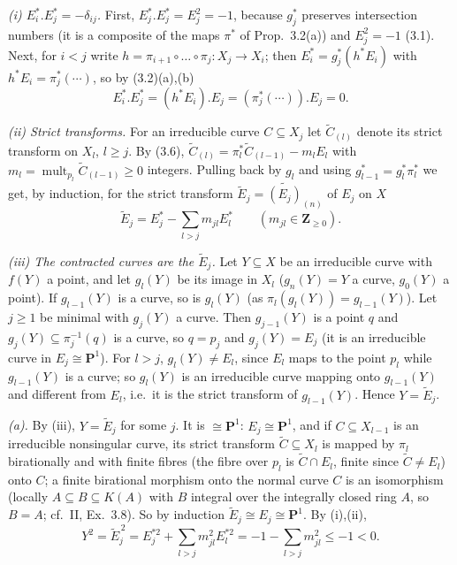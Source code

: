 \documentclass[11pt]{article}
\begin{document}
\emph{(i) $E_i^*.E_j^*=-\delta_{ij}$.} First, $E_j^*.E_j^*=E_j^2=-1$, because $g_j^*$ preserves intersection numbers (it is a composite of the maps $\pi^*$ of Prop.~3.2(a)) and $E_j^2=-1$ (3.1). Next, for $i<j$ write $h=\pi_{i+1}\circ\dots\circ\pi_j:X_j\to X_i$; then $E_i^*=g_j^*(h^*E_i)$ with $h^*E_i=\pi_j^*(\cdots)$, so by (3.2)(a),(b)
\[
E_i^*.E_j^*=(h^*E_i).E_j=(\pi_j^*(\cdots)).E_j=0 .
\]

\emph{(ii) Strict transforms.} For an irreducible curve $C\subseteq X_j$ let $\widetilde C_{(l)}$ denote its strict transform on $X_l$, $l\ge j$. By (3.6), $\widetilde C_{(l)}=\pi_l^*\widetilde C_{(l-1)}-m_lE_l$ with $m_l=\operatorname{mult}_{p_l}\widetilde C_{(l-1)}\ge0$ integers. Pulling back by $g_l$ and using $g_{l-1}^*=g_l^*\pi_l^*$ we get, by induction, for the strict transform $\widetilde E_j=\widetilde{(E_j)}_{(n)}$ of $E_j$ on $X$
\[
\widetilde E_j=E_j^*-\sum_{l>j}m_{jl}E_l^*\qquad(m_{jl}\in\mathbf Z_{\ge0}).
\]

\emph{(iii) The contracted curves are the $\widetilde E_j$.} Let $Y\subseteq X$ be an irreducible curve with $f(Y)$ a point, and let $g_l(Y)$ be its image in $X_l$ ($g_n(Y)=Y$ a curve, $g_0(Y)$ a point). If $g_{l-1}(Y)$ is a curve, so is $g_l(Y)$ (as $\pi_l(g_l(Y))=g_{l-1}(Y)$). Let $j\ge1$ be minimal with $g_j(Y)$ a curve. Then $g_{j-1}(Y)$ is a point $q$ and $g_j(Y)\subseteq\pi_j^{-1}(q)$ is a curve, so $q=p_j$ and $g_j(Y)=E_j$ (it is an irreducible curve in $E_j\cong\mathbf P^1$). For $l>j$, $g_l(Y)\ne E_l$, since $E_l$ maps to the point $p_l$ while $g_{l-1}(Y)$ is a curve; so $g_l(Y)$ is an irreducible curve mapping onto $g_{l-1}(Y)$ and different from $E_l$, i.e.\ it is the strict transform of $g_{l-1}(Y)$. Hence $Y=\widetilde E_j$.

\emph{(a).} By (iii), $Y=\widetilde E_j$ for some $j$. It is $\cong\mathbf P^1$: $E_j\cong\mathbf P^1$, and if $C\subseteq X_{l-1}$ is an irreducible nonsingular curve, its strict transform $\widetilde C\subseteq X_l$ is mapped by $\pi_l$ birationally and with finite fibres (the fibre over $p_l$ is $\widetilde C\cap E_l$, finite since $\widetilde C\ne E_l$) onto $C$; a finite birational morphism onto the normal curve $C$ is an isomorphism (locally $A\subseteq B\subseteq K(A)$ with $B$ integral over the integrally closed ring $A$, so $B=A$; cf.\ II, Ex.~3.8). So by induction $\widetilde E_j\cong E_j\cong\mathbf P^1$. By (i),(ii),
\[
Y^2=\widetilde E_j^{\,2}=E_j^{*2}+\sum_{l>j}m_{jl}^2E_l^{*2}=-1-\sum_{l>j}m_{jl}^2\le-1<0 .
\]
\end{document}
